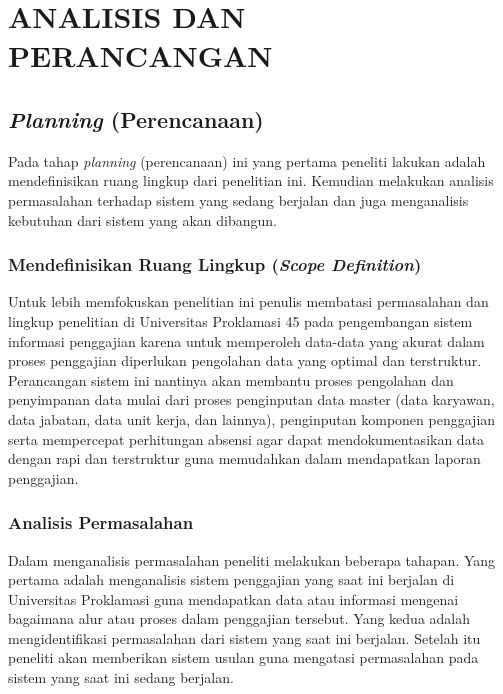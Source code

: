 \chapter{ANALISIS DAN PERANCANGAN}
	
\section{\emph{Planning} (Perencanaan)}
Pada tahap \emph{planning} (perencanaan) ini yang pertama peneliti lakukan adalah mendefinisikan ruang lingkup dari penelitian ini. Kemudian melakukan analisis permasalahan terhadap sistem yang sedang berjalan dan juga menganalisis kebutuhan dari sistem yang akan dibangun.

	\subsection{Mendefinisikan Ruang Lingkup (\emph{Scope Definition})}
	Untuk lebih memfokuskan penelitian ini penulis membatasi permasalahan dan lingkup penelitian di Universitas Proklamasi 45 pada pengembangan sistem informasi penggajian karena untuk memperoleh data-data yang akurat dalam proses penggajian diperlukan pengolahan data yang optimal dan terstruktur. Perancangan sistem ini nantinya akan membantu proses pengolahan dan penyimpanan data mulai dari proses penginputan data master (data karyawan, data jabatan, data unit kerja, dan lainnya), penginputan komponen penggajian serta mempercepat perhitungan absensi agar dapat mendokumentasikan data dengan rapi dan terstruktur guna memudahkan dalam mendapatkan laporan penggajian.
		
	\subsection{Analisis Permasalahan}
	Dalam menganalisis permasalahan peneliti melakukan beberapa tahapan. Yang pertama adalah menganalisis sistem penggajian yang saat ini berjalan di Universitas Proklamasi guna mendapatkan data atau informasi mengenai bagaimana alur atau proses dalam penggajian tersebut. Yang kedua adalah mengidentifikasi permasalahan dari sistem yang saat ini berjalan. Setelah itu peneliti akan memberikan sistem usulan guna mengatasi permasalahan pada sistem yang saat ini sedang berjalan.
			
